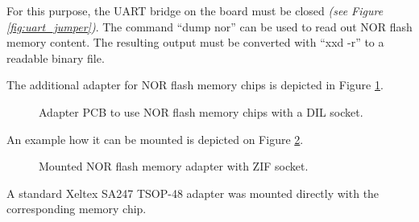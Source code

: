 \documentclass[a4paper]{report}
\begin{document}
For this purpose, the UART bridge on the board must be closed \textit{(see Figure \ref{fig:uart_jumper})}.
The command ``dump nor'' can be used to read out NOR flash memory content. 
The resulting output must be converted with ``xxd -r'' to a readable binary file.

The additional adapter for NOR flash memory chips is depicted in Figure \ref{fig:nor_pcb}.
\begin{figure}[ht] 
  \centering
  {
   \setlength{\fboxsep}{0pt}
   \setlength{\fboxrule}{0.5pt}
  }
  \caption{Adapter PCB to use NOR flash memory chips with a DIL socket.}
  \label{fig:nor_pcb}
\end{figure}
An example how it can be mounted is depicted on Figure \ref{fig:mounted_nor}.
\begin{figure}[ht] 
  \centering
  {
   \setlength{\fboxsep}{0pt}
   \setlength{\fboxrule}{0.5pt}
  }
  \caption{Mounted NOR flash memory adapter with ZIF socket.}
  \label{fig:mounted_nor}
\end{figure}
A standard Xeltex SA247 TSOP-48 adapter was mounted directly with the corresponding memory chip.
\end{document}
